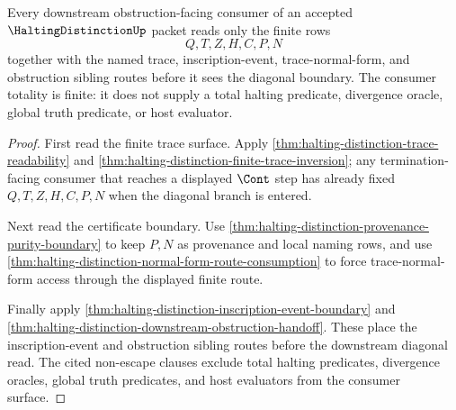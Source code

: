 \begin{theorem}
\label{thm:halting-distinction-diagonal-trace-consumer-totality}
Every downstream obstruction-facing consumer of an accepted $\HaltingDistinctionUp$ packet reads only the finite rows
$$
Q,T,Z,H,C,P,N
$$
together with the named trace, inscription-event, trace-normal-form, and obstruction sibling routes before it sees the diagonal boundary. The consumer totality is finite: it does not supply a total halting predicate, divergence oracle, global truth predicate, or host evaluator.
\end{theorem}
\begin{proof}
First read the finite trace surface. Apply \autoref{thm:halting-distinction-trace-readability} and \autoref{thm:halting-distinction-finite-trace-inversion}; any termination-facing consumer that reaches a displayed $\Cont$ step has already fixed $Q,T,Z,H,C,P,N$ when the diagonal branch is entered.

Next read the certificate boundary. Use \autoref{thm:halting-distinction-provenance-purity-boundary} to keep $P,N$ as provenance and local naming rows, and use \autoref{thm:halting-distinction-normal-form-route-consumption} to force trace-normal-form access through the displayed finite route.

Finally apply \autoref{thm:halting-distinction-inscription-event-boundary} and \autoref{thm:halting-distinction-downstream-obstruction-handoff}. These place the inscription-event and obstruction sibling routes before the downstream diagonal read. The cited non-escape clauses exclude total halting predicates, divergence oracles, global truth predicates, and host evaluators from the consumer surface.
\end{proof}

